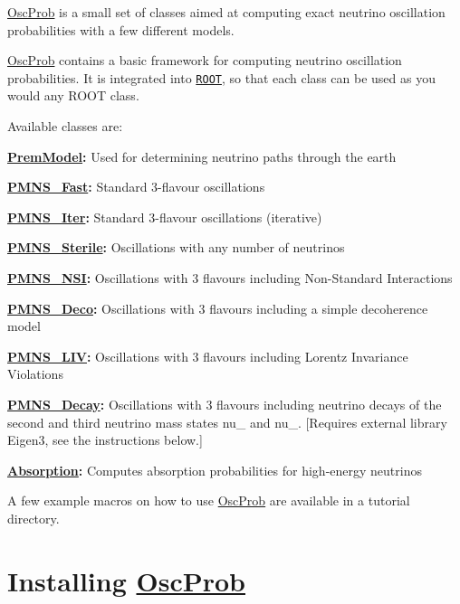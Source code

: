 \hyperlink{namespaceOscProb}{Osc\+Prob} is a small set of classes aimed at computing exact neutrino oscillation probabilities with a few different models.

\hyperlink{namespaceOscProb}{Osc\+Prob} contains a basic framework for computing neutrino oscillation probabilities. It is integrated into \href{https://root.cern.ch/}{\tt R\+O\+OT}, so that each class can be used as you would any R\+O\+OT class.

Available classes are\+:
\begin{DoxyItemize}
\item {\bfseries \hyperlink{classOscProb_1_1PremModel}{Prem\+Model}\+:} Used for determining neutrino paths through the earth
\item {\bfseries \hyperlink{classOscProb_1_1PMNS__Fast}{P\+M\+N\+S\+\_\+\+Fast}\+:} Standard 3-\/flavour oscillations
\item {\bfseries \hyperlink{classOscProb_1_1PMNS__Iter}{P\+M\+N\+S\+\_\+\+Iter}\+:} Standard 3-\/flavour oscillations (iterative)
\item {\bfseries \hyperlink{classOscProb_1_1PMNS__Sterile}{P\+M\+N\+S\+\_\+\+Sterile}\+:} Oscillations with any number of neutrinos
\item {\bfseries \hyperlink{classOscProb_1_1PMNS__NSI}{P\+M\+N\+S\+\_\+\+N\+SI}\+:} Oscillations with 3 flavours including Non-\/\+Standard Interactions
\item {\bfseries \hyperlink{classOscProb_1_1PMNS__Deco}{P\+M\+N\+S\+\_\+\+Deco}\+:} Oscillations with 3 flavours including a simple decoherence model
\item {\bfseries \hyperlink{classOscProb_1_1PMNS__LIV}{P\+M\+N\+S\+\_\+\+L\+IV}\+:} Oscillations with 3 flavours including Lorentz Invariance Violations
\item {\bfseries \hyperlink{classOscProb_1_1PMNS__Decay}{P\+M\+N\+S\+\_\+\+Decay}\+:} Oscillations with 3 flavours including neutrino decays of the second and third neutrino mass states nu\+\_ and nu\+\_. \mbox{[}Requires external library Eigen3, see the instructions below.\mbox{]}
\item {\bfseries \hyperlink{classOscProb_1_1Absorption}{Absorption}\+:} Computes absorption probabilities for high-\/energy neutrinos
\end{DoxyItemize}

A few example macros on how to use \hyperlink{namespaceOscProb}{Osc\+Prob} are available in a tutorial directory.

\section*{Installing \hyperlink{namespaceOscProb}{Osc\+Prob}}

